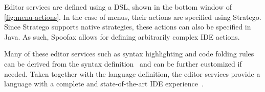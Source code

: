 Editor services are defined using a DSL, shown in the bottom window of
\cref{fig:menu-actions}. In the case of menus, their actions are
specified using Stratego. Since Stratego supports native strategies,
these actions can also be specified in Java. As such, Spoofax allows
for defining arbitrarily complex IDE actions.

Many of these editor services such as syntax highlighting and code
folding rules can be derived from the syntax
definition~\cite{Kats10c} and can be further customized if
needed. Taken together with the language definition, the editor
services provide a language with a complete and state-of-the-art IDE
experience~\cite{Kats10a}.
